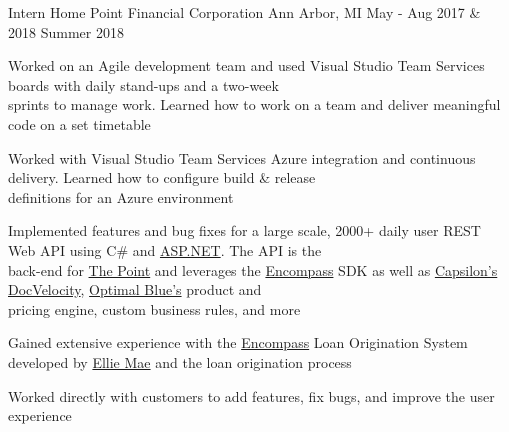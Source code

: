 



\begin{cventries}

\cventry
{Intern} %
{Home Point Financial Corporation} %
{Ann Arbor, MI} %
{May - Aug 2017 \& 2018} %
{}
\cventryx
{Summer 2018} %
{ %
	\begin{cvitems}
		\item {Worked on an Agile development team and used Visual Studio Team Services boards with daily stand-ups and a two-week\\ sprints to manage work. Learned how to work on a team and deliver meaningful code on a set timetable}
		\item {Worked with Visual Studio Team Services Azure integration and continuous delivery. Learned how to configure build \& release\\ definitions for an Azure environment}
		\item {Implemented features and bug fixes for a large scale, 2000+ daily user REST Web API using C\# and \textcolor{link}{\href{https://www.asp.net/}{ASP.NET}}.
		The API is the\\ back-end for \textcolor{link}{\href{https://tpo.homepointfinancial.com/}{The Point}} and leverages the \textcolor{link}{\href{https://www.elliemae.com/encompass/encompass-overview}{Encompass}} SDK as well as \textcolor{link}{\href{https://capsilon.com/solutions/}{Capsilon's DocVelocity}}, \textcolor{link}{\href{https://www2.optimalblue.com/}{Optimal Blue's}} product and\\ pricing engine, custom business rules, and more }
		\item {Gained extensive experience with the \textcolor{link}{\href{https://www.elliemae.com/encompass/encompass-overview}{Encompass}} Loan Origination System developed by \textcolor{link}{\href{https://www.elliemae.com/}{Ellie Mae}} and the loan origination process}
		\item {Worked directly with customers to add features, fix bugs, and improve the user experience}

\end{cvitems}}
\end{cventries}

